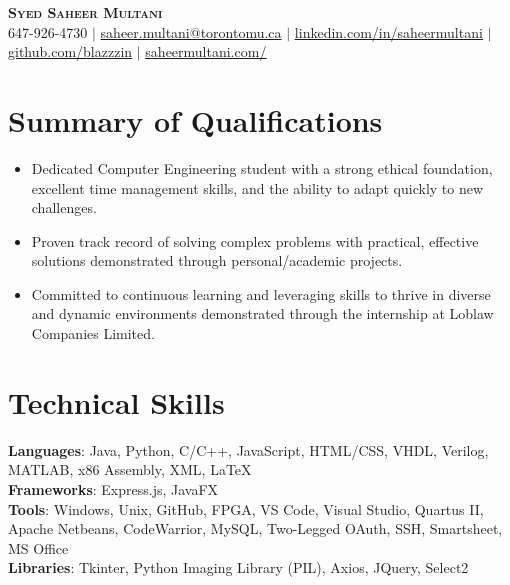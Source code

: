 \documentclass[letterpaper,11pt]{article}
\newcommand{\resumeItem}[1]{
  \item\small{
    {#1 \vspace{-2pt}}
  }
}
\newcommand{\resumeSubHeadingListStart}{\begin{itemize}[leftmargin=0.15in, label={}]}
\newcommand{\resumeSubHeadingListEnd}{\end{itemize}}
\newcommand{\resumeItemListStart}{\begin{itemize}}
\newcommand{\resumeItemListEnd}{\end{itemize}\vspace{-5pt}}
\begin{document}

\begin{center}
    \textbf{\Huge \scshape Syed Saheer Multani} \\ \vspace{1pt}
    \small 647-926-4730 $|$ \href{mailto:saheer.multani@torontomu.ca}{\small{saheer.multani@torontomu.ca}} $|$ 
    \href{https://linkedin.com/in/saheermultani}
    {\underline{linkedin.com/in/saheermultani}} $|$
    \href{https://github.com/blazzzin}
    {\underline{github.com/blazzzin}} $|$
    \href{https://saheermultani.com} 
    {\underline{saheermultani.com/}}
\end{center}

\section{Summary of Qualifications}
  \resumeSubHeadingListStart
    \resumeItemListStart
        \resumeItem{Dedicated Computer Engineering student with a strong ethical foundation, excellent time management skills, and the ability to adapt quickly to new challenges.}
        \resumeItem{Proven track record of solving complex problems with practical, effective solutions demonstrated through personal/academic projects.}
        \resumeItem{Committed to continuous learning and leveraging skills to thrive in diverse and dynamic environments demonstrated through the internship at Loblaw Companies Limited.}
    \resumeItemListEnd
  \resumeSubHeadingListEnd

\section{Technical Skills}
 \begin{itemize}[leftmargin=0.15in, label={}]
    \small{\item{
     \textbf{Languages}{: Java, Python, C/C++, JavaScript, HTML/CSS, VHDL, Verilog, MATLAB, x86 Assembly, XML, LaTeX} \\
     \textbf{Frameworks}{: Express.js, JavaFX} \\
     \textbf{Tools}{: Windows, Unix, GitHub, FPGA, VS Code, Visual Studio, Quartus II, Apache Netbeans, CodeWarrior, MySQL, Two-Legged OAuth, SSH, Smartsheet, MS Office} \\
     \textbf{Libraries}{: Tkinter, Python Imaging Library (PIL), Axios, JQuery, Select2}
    }}
 \end{itemize}
\end{document}
